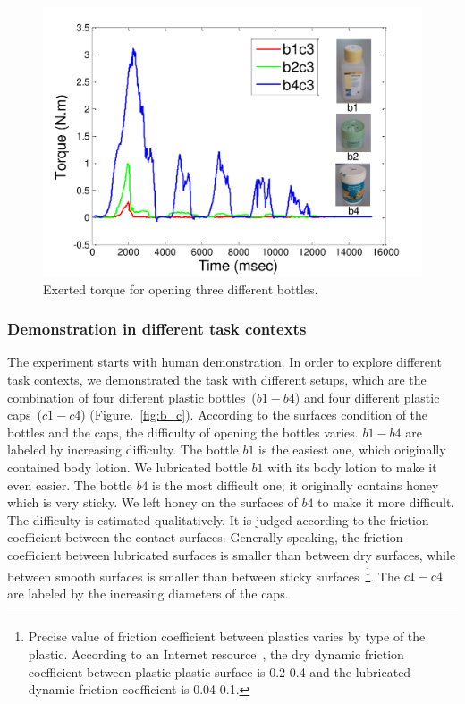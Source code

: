 \begin{figure}
  \centering
  \includegraphics[width=12cm]{./fig_cha4/b1b2b4_time_T.pdf}
  \caption{ \scriptsize{Exerted torque for opening three different bottles.}
}
\label{fig:bottlepatterns}
\end{figure}


\subsubsection{Demonstration in different task contexts}
\label{cha4:sec3:experimentsetup:taskcontexts}
The experiment starts with human demonstration. In order to explore
different task contexts, we demonstrated the task with different
setups, which are the combination of four different plastic
bottles~($b1-b4$) and four different plastic caps~($c1-c4$)
(Figure.~\ref{fig:b_c}). According to the surfaces condition of the
bottles and the caps, the difficulty of opening the bottles
varies. $b1-b4$ are labeled by increasing difficulty. The bottle $b1$
is the easiest one, which originally contained body lotion. We
lubricated bottle $b1$ with its body lotion to make it even easier. The
bottle $b4$ is the most difficult one; it originally contains honey
which is very sticky. We left honey on the surfaces of $b4$ to make
it more difficult. The difficulty is estimated qualitatively. It is
judged according to the friction coefficient between the contact
surfaces. Generally speaking, the friction coefficient between
lubricated surfaces is smaller than between dry surfaces, while
between smooth surfaces is smaller than between sticky
surfaces~\footnote{Precise value of friction coefficient between
plastics varies by type of the plastic. According to an Internet
resource~\citep{FOC}, the dry dynamic friction coefficient between
plastic-plastic surface is 0.2-0.4 and the lubricated dynamic
friction coefficient is 0.04-0.1.}. The $c1-c4$ are labeled by the increasing diameters of the caps.

